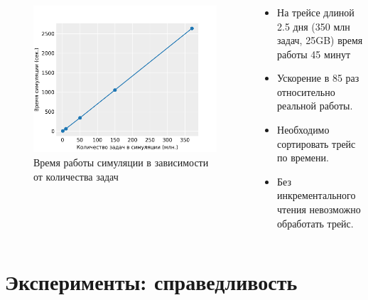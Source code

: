\documentclass[t]{beamer}  %
\begin{document}
\begin{frame}[fragile]
	\frametitle{\insertsection} 
	\framesubtitle{\insertsubsection}
	
	\begin{columns}[t]
		\begin{column}{0.7\linewidth}
			\vspace{-1cm}
	\begin{figure}[H]
		\centering 
		\includegraphics[width=\linewidth]{images/simulation_time}
		\caption*{Время работы симуляции в зависимости от количества задач}
	  \end{figure}
	\end{column} 
	\hspace{-1cm}
	\begin{column}{0.5\linewidth}
		\begin{itemize}
			\item На трейсе длиной 2.5 дня (350 млн задач, 25GB) время работы 45 минут
			\item Ускорение в 85 раз относительно реальной работы. 
			\item Необходимо сортировать трейс по времени.
			\item Без инкрементального чтения невозможно обработать трейс.
		\end{itemize}
	\end{column}
\end{columns}
\end{frame}

\section{Эксперименты: справедливость}
\end{document}
